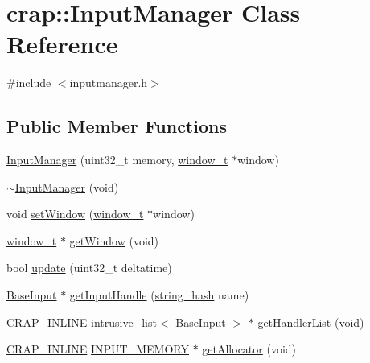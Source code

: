 \hypertarget{classcrap_1_1_input_manager}{}\section{crap\+:\+:Input\+Manager Class Reference}
\label{classcrap_1_1_input_manager}


{\ttfamily \#include $<$inputmanager.\+h$>$}

\subsection*{Public Member Functions}
\begin{DoxyCompactItemize}
\item 
\hyperlink{classcrap_1_1_input_manager_a6dd61476f36b0b93e99dc7ecfbfe60ec}{Input\+Manager} (uint32\+\_\+t memory, \hyperlink{namespacecrap_a3917356677c911215fe8f50465f335bf}{window\+\_\+t} $\ast$window)
\item 
\hyperlink{classcrap_1_1_input_manager_ae243494c32500ea9dc9e55e14ce3d02e}{$\sim$\+Input\+Manager} (void)
\item 
void \hyperlink{classcrap_1_1_input_manager_a87d573eef5165a51c0fbec247aeb7c2b}{set\+Window} (\hyperlink{namespacecrap_a3917356677c911215fe8f50465f335bf}{window\+\_\+t} $\ast$window)
\item 
\hyperlink{namespacecrap_a3917356677c911215fe8f50465f335bf}{window\+\_\+t} $\ast$ \hyperlink{classcrap_1_1_input_manager_afd01a81a1f05ab1a1efa6c4373a68251}{get\+Window} (void)
\item 
bool \hyperlink{classcrap_1_1_input_manager_a5aa76f41add8212ba22bb7c88d3a28e8}{update} (uint32\+\_\+t deltatime)
\item 
\hyperlink{classcrap_1_1_base_input}{Base\+Input} $\ast$ \hyperlink{classcrap_1_1_input_manager_a9404546f2798f264429f77993e4e30e0}{get\+Input\+Handle} (\hyperlink{classcrap_1_1string__hash}{string\+\_\+hash} name)
\item 
\hyperlink{config__x86_8h_a5a40526b8d842e7ff731509998bb0f1c}{C\+R\+A\+P\+\_\+\+I\+N\+L\+I\+N\+E} \hyperlink{classcrap_1_1intrusive__list}{intrusive\+\_\+list}$<$ \hyperlink{classcrap_1_1_base_input}{Base\+Input} $>$ $\ast$ \hyperlink{classcrap_1_1_input_manager_af3e361e7d6e01fdf9c02280d15820a55}{get\+Handler\+List} (void)
\item 
\hyperlink{config__x86_8h_a5a40526b8d842e7ff731509998bb0f1c}{C\+R\+A\+P\+\_\+\+I\+N\+L\+I\+N\+E} \hyperlink{inputmanager_8h_a50dc0ae1528660c54a99d738ab327b9f}{I\+N\+P\+U\+T\+\_\+\+M\+E\+M\+O\+R\+Y} $\ast$ \hyperlink{classcrap_1_1_input_manager_a3d3f6e7bcadd7f01bff8baf4fd95d987}{get\+Allocator} (void)
\end{DoxyCompactItemize}


